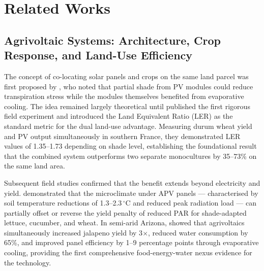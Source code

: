
\section{Related Works}
\label{sec:related}

\subsection{Agrivoltaic Systems: Architecture, Crop Response, and
Land-Use Efficiency}

\hspace{1cm}The concept of co-locating solar panels and crops on the same
land parcel was first proposed by \citet{goetzberger1982}, who noted that
partial shade from PV modules could reduce transpiration stress while the
modules themselves benefited from evaporative cooling. The idea remained
largely theoretical until \citet{dupraz2011} published the first rigorous
field experiment and introduced the Land Equivalent Ratio (LER) as the
standard metric for the dual land-use advantage. Measuring durum wheat
yield and PV output simultaneously in southern France, they demonstrated
LER values of 1.35--1.73 depending on shade level, establishing the
foundational result that the combined system outperforms two separate
monocultures by 35--73\% on the same land area.

Subsequent field studies confirmed that the benefit extends beyond
electricity and yield. \citet{marrou2013} demonstrated that the microclimate
under APV panels --- characterised by soil temperature reductions of
1.3--2.3\,$^{\circ}$C and reduced peak radiation load --- can partially
offset or reverse the yield penalty of reduced PAR for shade-adapted
lettuce, cucumber, and wheat. In semi-arid Arizona, \citet{barron2019}
showed that agrivoltaics simultaneously increased jalapeno yield by
3$\times$, reduced water consumption by 65\%, and improved panel
efficiency by 1--9 percentage points through evaporative cooling,
providing the first comprehensive food-energy-water nexus evidence for
the technology.

